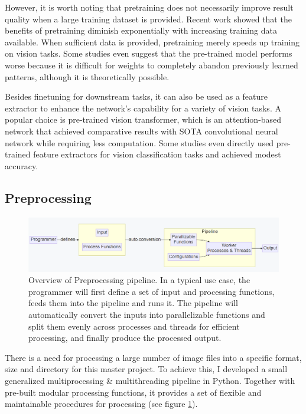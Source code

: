 However, it is worth noting that pretraining does not necessarily improve result quality when a large training dataset is provided. Recent work showed that the benefits of pretraining diminish exponentially with increasing training data available. When sufficient data is provided, pretraining merely speeds up training on vision tasks\cite{heRethinkingImageNetPretraining2018}. Some studies even suggest that the pre-trained model performs worse because it is difficult for weights to completely abandon previously learned patterns, although it is theoretically possible\cite{el-noubyAreLargescaleDatasets2021}. 

Besides finetuning for downstream tasks, it can also be used as a feature extractor to enhance the network's capability for a variety of vision tasks. A popular choice is pre-trained vision transformer\cite{dosovitskiyImageWorth16x162021}, which is an attention-based network that achieved comparative results with SOTA convolutional neural network while requiring less computation. Some studies even directly used pre-trained feature extractors for vision classification tasks and achieved modest accuracy\cite{awaisCanPretrainedConvolutional2020}.


\subsection{Preprocessing}

\begin{figure}
    \centering
    \includegraphics[width=1.0\textwidth]{images/introduction/preprocess_pipeline.png}
    \caption{Overview of Preprocessing pipeline. In a typical use case, the programmer will first define a set of input and processing functions, feeds them into the pipeline and runs it. The pipeline will automatically convert the inputs into parallelizable functions and split them evenly across processes and threads for efficient processing, and finally produce the processed output.} 
    \label{fig:preprocess_pipeline}
\end{figure}

There is a need for processing a large number of image files into a specific format, size and directory for this master project. To achieve this, I developed a small generalized multiprocessing \& multithreading pipeline in Python\cite{WelcomePythonOrg}. Together with pre-built modular processing functions, it provides a set of flexible and maintainable procedures for processing (see figure \ref{fig:preprocess_pipeline}).




